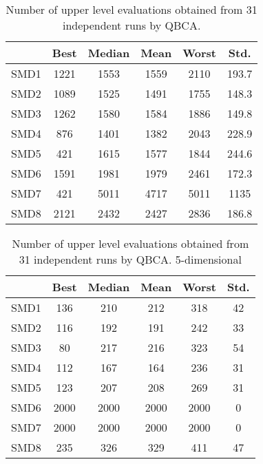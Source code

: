 \documentclass[conference]{IEEEtran}
\theoremstyle{definition}
\begin{document}
\begin{table}[htbp]
    \caption{Number of upper level evaluations obtained from 31 independent runs by QBCA.}
    \label{tab:ul-evals}
    \centering
    \begin{tabular}{cccccc}
        \hline
        & Best &  Median &  Mean &  Worst &  Std. \\ \hline
        SMD1 & 1221 & 1553 & 1559 & 2110 & 193.7 \\ \hline 
        SMD2 & 1089 & 1525 & 1491 & 1755 & 148.3 \\ \hline 
        SMD3 & 1262 & 1580 & 1584 & 1886 & 149.8 \\ \hline 
        SMD4 & 876 & 1401 & 1382 & 2043 & 228.9 \\ \hline 
        SMD5 & 421 & 1615 & 1577 & 1844 & 244.6 \\ \hline 
        SMD6 & 1591 & 1981 & 1979 & 2461 & 172.3 \\ \hline 
        SMD7 & 421 & 5011 & 4717 & 5011 & 1135 \\ \hline 
        SMD8 & 2121 & 2432 & 2427 & 2836 & 186.8 \\ \hline 
    \end{tabular}
\end{table}

\begin{table}[htbp]
    \caption{Number of upper level evaluations obtained from 31 independent runs by QBCA. 5-dimensional}
    \label{tab:ul-evals-5}
    \centering
    \begin{tabular}{cccccc}
        \hline
             & Best &  Median &  Mean &  Worst &  Std. \\ \hline
        SMD1 & 136 & 210 & 212 & 318 & 42 \\ \hline 
        SMD2 & 116 & 192 & 191 & 242 & 33 \\ \hline 
        SMD3 & 80 & 217 & 216 & 323 & 54 \\ \hline 
        SMD4 & 112 & 167 & 164 & 236 & 31 \\ \hline 
        SMD5 & 123 & 207 & 208 & 269 & 31 \\ \hline 
        SMD6 & 2000 & 2000 & 2000 & 2000 & 0 \\ \hline 
        SMD7 & 2000 & 2000 & 2000 & 2000 & 0 \\ \hline 
        SMD8 & 235 & 326 & 329 & 411 & 47 \\ \hline 
    \end{tabular}
\end{table}
\end{document}
